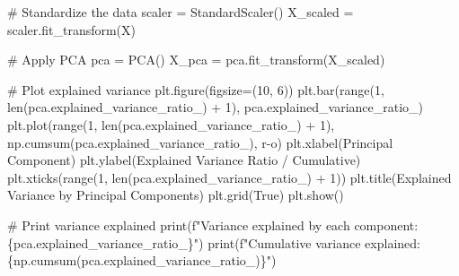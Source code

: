 \documentclass[
  letterpaper,
  DIV=11,
  numbers=noendperiod]{scrreprt}
\newenvironment{Shaded}{\begin{snugshade}}{\end{snugshade}}
\newcommand{\BuiltInTok}[1]{\textcolor[rgb]{0.00,0.23,0.31}{#1}}
\newcommand{\CommentTok}[1]{\textcolor[rgb]{0.37,0.37,0.37}{#1}}
\newcommand{\DecValTok}[1]{\textcolor[rgb]{0.68,0.00,0.00}{#1}}
\newcommand{\NormalTok}[1]{\textcolor[rgb]{0.00,0.23,0.31}{#1}}
\newcommand{\OperatorTok}[1]{\textcolor[rgb]{0.37,0.37,0.37}{#1}}
\newcommand{\SpecialCharTok}[1]{\textcolor[rgb]{0.37,0.37,0.37}{#1}}
\newcommand{\SpecialStringTok}[1]{\textcolor[rgb]{0.13,0.47,0.30}{#1}}
\newcommand{\StringTok}[1]{\textcolor[rgb]{0.13,0.47,0.30}{#1}}
\newcommand{\VariableTok}[1]{\textcolor[rgb]{0.07,0.07,0.07}{#1}}
\begin{document}
\begin{Shaded}
\begin{Highlighting}[]
\CommentTok{\# Standardize the data}
\NormalTok{scaler }\OperatorTok{=}\NormalTok{ StandardScaler()}
\NormalTok{X\_scaled }\OperatorTok{=}\NormalTok{ scaler.fit\_transform(X)}

\CommentTok{\# Apply PCA}
\NormalTok{pca }\OperatorTok{=}\NormalTok{ PCA()}
\NormalTok{X\_pca }\OperatorTok{=}\NormalTok{ pca.fit\_transform(X\_scaled)}

\CommentTok{\# Plot explained variance}
\NormalTok{plt.figure(figsize}\OperatorTok{=}\NormalTok{(}\DecValTok{10}\NormalTok{, }\DecValTok{6}\NormalTok{))}
\NormalTok{plt.bar(}\BuiltInTok{range}\NormalTok{(}\DecValTok{1}\NormalTok{, }\BuiltInTok{len}\NormalTok{(pca.explained\_variance\_ratio\_) }\OperatorTok{+} \DecValTok{1}\NormalTok{), pca.explained\_variance\_ratio\_)}
\NormalTok{plt.plot(}\BuiltInTok{range}\NormalTok{(}\DecValTok{1}\NormalTok{, }\BuiltInTok{len}\NormalTok{(pca.explained\_variance\_ratio\_) }\OperatorTok{+} \DecValTok{1}\NormalTok{), }
\NormalTok{         np.cumsum(pca.explained\_variance\_ratio\_), }\StringTok{\textquotesingle{}r{-}o\textquotesingle{}}\NormalTok{)}
\NormalTok{plt.xlabel(}\StringTok{\textquotesingle{}Principal Component\textquotesingle{}}\NormalTok{)}
\NormalTok{plt.ylabel(}\StringTok{\textquotesingle{}Explained Variance Ratio / Cumulative\textquotesingle{}}\NormalTok{)}
\NormalTok{plt.xticks(}\BuiltInTok{range}\NormalTok{(}\DecValTok{1}\NormalTok{, }\BuiltInTok{len}\NormalTok{(pca.explained\_variance\_ratio\_) }\OperatorTok{+} \DecValTok{1}\NormalTok{))}
\NormalTok{plt.title(}\StringTok{\textquotesingle{}Explained Variance by Principal Components\textquotesingle{}}\NormalTok{)}
\NormalTok{plt.grid(}\VariableTok{True}\NormalTok{)}
\NormalTok{plt.show()}

\CommentTok{\# Print variance explained}
\BuiltInTok{print}\NormalTok{(}\SpecialStringTok{f"Variance explained by each component: }\SpecialCharTok{\{}\NormalTok{pca}\SpecialCharTok{.}\NormalTok{explained\_variance\_ratio\_}\SpecialCharTok{\}}\SpecialStringTok{"}\NormalTok{)}
\BuiltInTok{print}\NormalTok{(}\SpecialStringTok{f"Cumulative variance explained: }\SpecialCharTok{\{}\NormalTok{np}\SpecialCharTok{.}\NormalTok{cumsum(pca.explained\_variance\_ratio\_)}\SpecialCharTok{\}}\SpecialStringTok{"}\NormalTok{)}


\end{Highlighting}
\end{Shaded}
\end{document}
